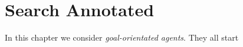\chapter{Search Annotated}
    In this chapter we consider \emph{goal-orientated agents}. They all start
